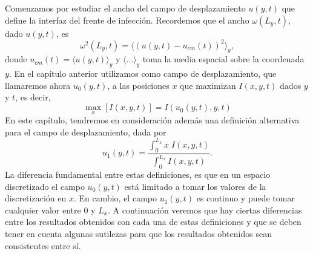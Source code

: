 

Comenzamos por estudiar el ancho del campo de desplazamiento $u(y,t)$ que define la interfaz del frente de infección. Recordemos que el ancho $\omega(L_y,t)$, dado $u(y,t)$, es 
\begin{equation}
    \omega^2(L_y,t) = \langle (u(y,t) - u_{cm}(t))^2 \rangle_y, 
\end{equation} 
donde $u_{cm}(t) = \langle u(y,t) \rangle_y$ y $\langle \hdots \rangle_y$ toma la media espacial sobre la coordenada $y$. En el capítulo anterior utilizamos como campo de desplazamiento, que llamaremos ahora $u_0(y,t)$, a las posiciones $x$ que maximizan $I(x,y,t)$ dados $y$ y $t$, es decir,
\begin{equation}
    \max_x[I(x, y, t)]=I(u_0(y, t), y, t)
\end{equation}
En este capítulo, tendremos en consideración además una definición alternativa para el campo de desplazamiento, dada por 
\begin{equation}
    u_1(y,t) =  \frac{\int_{0}^{L_x} x \; I(x,y,t)}{\int_{0}^{L_x} I(x,y,t)}. 
\end{equation}
La diferencia fundamental entre estas definiciones, es que en un espacio discretizado el campo $u_0(y,t)$ está limitado a tomar los valores de la discretización en $x$. En cambio, el campo $u_1(y,t)$ es continuo y puede tomar cualquier valor entre $0$ y $L_x$. A continuación veremos que hay ciertas diferencias entre los resultados obtenidos con cada una de estas definiciones y que se deben tener en cuenta algunas sutilezas para que los resultados obtenidos sean consistentes entre sí.

